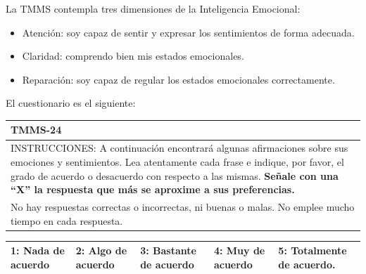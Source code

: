 \documentclass[
  10pt,
  spanish,
]{article}
\providecommand{\tightlist}{%
  \setlength{\itemsep}{0pt}\setlength{\parskip}{0pt}}
\begin{document}
La TMMS contempla tres dimensiones de la Inteligencia Emocional:

\begin{itemize}
\tightlist
\item
  Atención: soy capaz de sentir y expresar los sentimientos de forma
  adecuada.
\item
  Claridad: comprendo bien mis estados emocionales.
\item
  Reparación: soy capaz de regular los estados emocionales
  correctamente.
\end{itemize}

El cuestionario es el siguiente:

\begin{longtable}[]{@{}l@{}}
\toprule
\begin{minipage}[b]{0.97\columnwidth}\raggedright
\textbf{TMMS-24}\strut
\end{minipage}\tabularnewline
\midrule
\endhead
\begin{minipage}[t]{0.97\columnwidth}\raggedright
INSTRUCCIONES: A continuación encontrará algunas afirmaciones sobre sus
emociones y sentimientos. Lea atentamente cada frase e indique, por
favor, el grado de acuerdo o desacuerdo con respecto a las mismas.
\textbf{Señale con una ``X'' la respuesta que más se aproxime a sus
preferencias.}\strut
\end{minipage}\tabularnewline
\begin{minipage}[t]{0.97\columnwidth}\raggedright
No hay respuestas correctas o incorrectas, ni buenas o malas. No emplee
mucho tiempo en cada respuesta.\strut
\end{minipage}\tabularnewline
\bottomrule
\end{longtable}

\begin{longtable}[]{@{}lllll@{}}
\toprule
\endhead
\begin{minipage}[t]{0.16\columnwidth}\raggedright
\textbf{1}: Nada de acuerdo\strut
\end{minipage} & \begin{minipage}[t]{0.16\columnwidth}\raggedright
\textbf{2}: Algo de acuerdo\strut
\end{minipage} & \begin{minipage}[t]{0.19\columnwidth}\raggedright
\textbf{3}: Bastante de acuerdo\strut
\end{minipage} & \begin{minipage}[t]{0.15\columnwidth}\raggedright
\textbf{4}: Muy de acuerdo\strut
\end{minipage} & \begin{minipage}[t]{0.21\columnwidth}\raggedright
\textbf{5}: Totalmente de acuerdo.\strut
\end{minipage}\tabularnewline
\bottomrule
\end{longtable}
\end{document}

